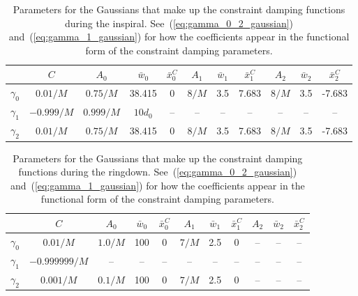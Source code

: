 \documentclass[12pt]{caltech_thesis}
\newcommand{\br}{\toprule[1.5pt]}
\def\lineup{\def\0{\hbox{\phantom{\footnotesize\rm 0}}}%
    \def\m{\hbox{$\phantom{-}$}}%
    \def\-{\llap{$-$}}}
\begin{document}
\begin{bibunit}[unsrtnat]
\begin{table}
  \caption{\label{table:inspiral_damping} Parameters for the Gaussians that make
    up the constraint damping functions during the
    inspiral. See~(\ref{eq:gamma_0_2_gaussian}) and~(\ref{eq:gamma_1_gaussian})
    for how the coefficients appear in the functional form of the constraint
    damping parameters.}
  \begin{indented}
    \lineup
  \item[]\hspace{-0.0em}\begin{tabular}{@{}ccccccccccc} \br & $C$ & $A_0$ &
      $\bar{w}_0$ & $\bar{x}_0^C$ & $A_1$ & $\bar{w}_1$ & $\bar{x}_1^C$
    & $A_2$ & $\bar{w}_2$ & $\bar{x}_2^C$ \\
    \hline $\gamma_0$ & $0.01/M$ & $0.75/M$ & 38.415 & 0 & $8/M$ & 3.5 & 7.683
    & $8/M$ & 3.5 & -7.683 \\
    $\gamma_1$ & $-0.999/M$ & $0.999/M$ & $10 d_0$ & -- & -- & -- & --
    & -- & -- & -- \\
    $\gamma_2$ & $0.01/M$ & $0.75/M$ & 38.415 & 0 & $8/M$ & 3.5 & 7.683
    & $8/M$ & 3.5 & -7.683 \\
    \br
  \end{tabular}
\end{indented}
\end{table}

\begin{table}
  \caption{\label{table:ringdown_damping} Parameters for the Gaussians that make
    up the constraint damping functions during the
    ringdown. See~(\ref{eq:gamma_0_2_gaussian}) and~(\ref{eq:gamma_1_gaussian})
    for how the coefficients appear in the functional form of the constraint
    damping parameters.}
  \begin{indented}
    \lineup
  \item[]\hspace{-0.0em}\begin{tabular}{@{}ccccccccccc} \br
  & $C$ & $A_0$ & $\bar{w}_0$ & $\bar{x}_0^C$
  & $A_1$ & $\bar{w}_1$ & $\bar{x}_1^C$
  & $A_2$ & $\bar{w}_2$ & $\bar{x}_2^C$ \\
  \hline
  $\gamma_0$ & $0.01/M$ & $1.0/M$ & 100 & 0
  & $7/M$ & 2.5 & 0
  & -- & -- & -- \\
  $\gamma_1$ & $-0.999999/M$ & -- & -- & --
  & -- & -- & --
  & -- & -- & -- \\
  $\gamma_2$ & $0.001/M$ & $0.1/M$ & 100 & 0
  & $7/M$ & 2.5 & 0
  & -- & -- & -- \\
  \br
  \end{tabular}
\end{indented}
\end{table}


\end{bibunit}
\end{document}
